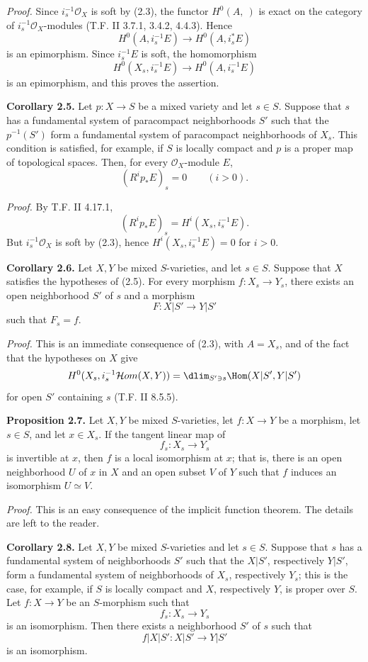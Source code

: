 \documentclass[11pt]{article}
\begin{document}
\emph{Proof.} Since $i_s^{-1}\mathcal O_X$ is soft by (2.3), the functor $H^0(A,\ )$ is exact on the category of $i_s^{-1}\mathcal O_X$-modules (T.F. II 3.7.1, 3.4.2, 4.4.3). Hence
\[
 H^0(A,i_s^{-1}E)\longrightarrow H^0(A,i_s^*E)
\]
is an epimorphism. Since $i_s^{-1}E$ is soft, the homomorphism
\[
 H^0(X_s,i_s^{-1}E)\longrightarrow H^0(A,i_s^{-1}E)
\]
is an epimorphism, and this proves the assertion.

\textbf{Corollary 2.5.} Let $p:X\to S$ be a mixed variety and let $s\in S$. Suppose that $s$ has a fundamental system of paracompact neighborhoods $S'$ such that the $p^{-1}(S')$ form a fundamental system of paracompact neighborhoods of $X_s$. This condition is satisfied, for example, if $S$ is locally compact and $p$ is a proper map of topological spaces. Then, for every $\mathcal O_X$-module $E$,
\[
 (R^ip_*E)_s=0\qquad(i>0).
\]

\emph{Proof.} By T.F. II 4.17.1,
\[
 (R^ip_*E)_s=H^i(X_s,i_s^{-1}E).
\]
But $i_s^{-1}\mathcal O_X$ is soft by (2.3), hence $H^i(X_s,i_s^{-1}E)=0$ for $i>0$.

\textbf{Corollary 2.6.} Let $X,Y$ be mixed $S$-varieties, and let $s\in S$. Suppose that $X$ satisfies the hypotheses of (2.5). For every morphism $f:X_s\to Y_s$, there exists an open neighborhood $S'$ of $s$ and a morphism
\[
 F:X|S'\longrightarrow Y|S'
\]
such that $F_s=f$.

\emph{Proof.} This is an immediate consequence of (2.3), with $A=X_s$, and of the fact that the hypotheses on $X$ give
\[
 H^0(X_s,i_s^{-1}\mathcal Hom(X,Y))
 =\dlim_{S'\ni s}\Hom(X|S',Y|S')
\]
for open $S'$ containing $s$ (T.F. II 8.5.5).

\textbf{Proposition 2.7.} Let $X,Y$ be mixed $S$-varieties, let $f:X\to Y$ be a morphism, let $s\in S$, and let $x\in X_s$. If the tangent linear map of
\[
 f_s:X_s\longrightarrow Y_s
\]
is invertible at $x$, then $f$ is a local isomorphism at $x$; that is, there is an open neighborhood $U$ of $x$ in $X$ and an open subset $V$ of $Y$ such that $f$ induces an isomorphism $U\simeq V$.

\emph{Proof.} This is an easy consequence of the implicit function theorem. The details are left to the reader.

\textbf{Corollary 2.8.} Let $X,Y$ be mixed $S$-varieties and let $s\in S$. Suppose that $s$ has a fundamental system of neighborhoods $S'$ such that the $X|S'$, respectively $Y|S'$, form a fundamental system of neighborhoods of $X_s$, respectively $Y_s$; this is the case, for example, if $S$ is locally compact and $X$, respectively $Y$, is proper over $S$. Let $f:X\to Y$ be an $S$-morphism such that
\[
 f_s:X_s\longrightarrow Y_s
\]
is an isomorphism. Then there exists a neighborhood $S'$ of $s$ such that
\[
 f|X|S':X|S'\longrightarrow Y|S'
\]
is an isomorphism.
\end{document}
